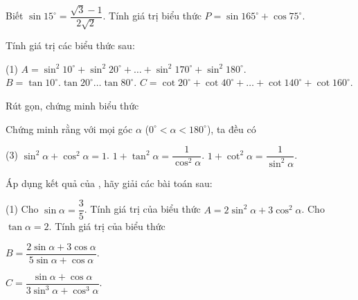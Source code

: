\begin{vd}
	Biết $\sin15^\circ=\dfrac{\sqrt{3}-1}{2\sqrt{2}}$. Tính giá trị biểu thức $P=\sin165^\circ+\cos75^\circ$.
\end{vd}

\begin{vd}%
	Tính giá trị các biểu thức sau:
	\begin{tasks}(1)
		\task $A=\sin^2 10^{\circ}+\sin^2 20^{\circ}+\dots+\sin^2 170^{\circ}+\sin^2 180^{\circ}$.
		\task $B=\tan 10^{\circ}.\tan 20^{\circ}\dots\tan 80^{\circ}$.
		\task $C=\cot 20^{\circ}+\cot 40^{\circ}+\dots +\cot 140^{\circ}+\cot160^{\circ}$.
	\end{tasks}
\end{vd}
\begin{dang}{Rút gọn, chứng minh biểu thức}
\end{dang}
	\begin{vd}
		Chứng minh rằng với mọi góc $\alpha$ ($0^\circ< \alpha < 180^\circ$), ta đều có
		\begin{tasks}(3)
			\task $\sin^2\alpha + \cos^2\alpha =1$.
			\task $1+\tan^2\alpha=\dfrac{1}{\cos^2\alpha}$.
			\task $1+\cot^2\alpha=\dfrac{1}{\sin^2\alpha}$.
		\end{tasks}
	\end{vd}

	\begin{vd}
	Áp dụng kết quả của , hãy giải các bài toán sau:
	\begin{tasks}(1)
		\task Cho $\sin\alpha = \dfrac{3}{5}$. Tính giá trị của biểu thức $A=2\sin^2\alpha+3\cos^2\alpha$.
		\task Cho $\tan\alpha = 2$. Tính giá trị của biểu thức 
		\begin{enumEX}[*]{2}
			\item $B=\dfrac{2\sin\alpha+3\cos\alpha}{5\sin\alpha+\cos\alpha}$.
			\item $C=\dfrac{\sin\alpha+\cos\alpha}{3\sin^3\alpha+\cos^3\alpha}$.
		\end{enumEX}
	\end{tasks}
	
	\end{vd}

